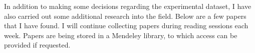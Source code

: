 \documentclass{mattreport}
\begin{document}
In addition to making some decisions regarding the experimental dataset, I have also carried out some additional research into the field. Below are a few papers that I have found. I will continue collecting papers during reading sessions each week. Papers are being stored in a Mendeley library, to which access can be provided if requested.\\




\newpage
\printbibliography
\end{document}
